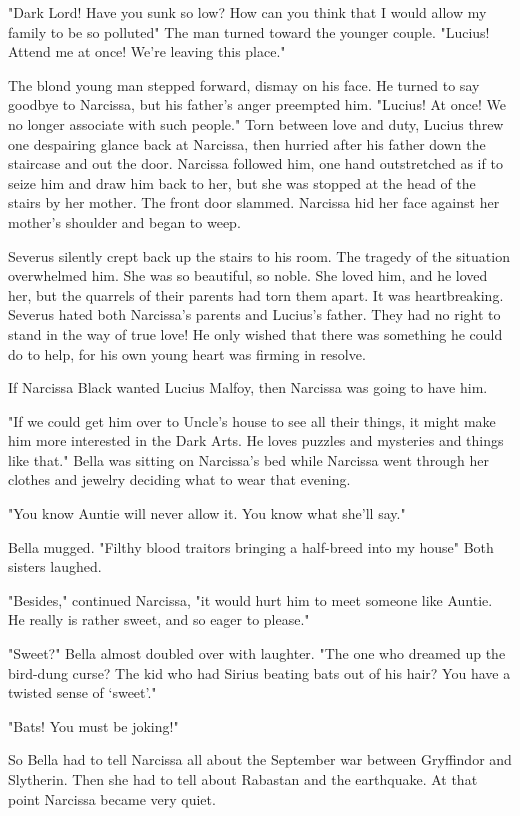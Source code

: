 "Dark Lord! Have you sunk so low? How can you think that I would allow my family to be so polluted{\el}" The man turned toward the younger couple. "Lucius! Attend me at once! We're leaving this place."

The blond young man stepped forward, dismay on his face. He turned to say goodbye to Narcissa, but his father's anger preempted him. "Lucius! At once! We no longer associate with such people." Torn between love and duty, Lucius threw one despairing glance back at Narcissa, then hurried after his father down the staircase and out the door. Narcissa followed him, one hand outstretched as if to seize him and draw him back to her, but she was stopped at the head of the stairs by her mother. The front door slammed. Narcissa hid her face against her mother's shoulder and began to weep.

Severus silently crept back up the stairs to his room. The tragedy of the situation overwhelmed him. She was so beautiful, so noble. She loved him, and he loved her, but the quarrels of their parents had torn them apart. It was heartbreaking. Severus hated both Narcissa's parents and Lucius's father. They had no right to stand in the way of true love! He only wished that there was something he could do to help, for his own young heart was firming in resolve.

If Narcissa Black wanted Lucius Malfoy, then Narcissa was going to have him.

"If we could get him over to Uncle's house to see all their things, it might make him more interested in the Dark Arts. He loves puzzles and mysteries and things like that." Bella was sitting on Narcissa's bed while Narcissa went through her clothes and jewelry deciding what to wear that evening.

"You know Auntie will never allow it. You know what she'll say."

Bella mugged. "Filthy blood traitors bringing a half-breed into my house{\el}" Both sisters laughed.

"Besides," continued Narcissa, "it would hurt him to meet someone like Auntie. He really is rather sweet, and so eager to please."

"Sweet?" Bella almost doubled over with laughter. "The one who dreamed up the bird-dung curse? The kid who had Sirius beating bats out of his hair? You have a twisted sense of `sweet'."

"Bats! You must be joking!"

So Bella had to tell Narcissa all about the September war between Gryffindor and Slytherin. Then she had to tell about Rabastan and the earthquake. At that point Narcissa became very quiet.

